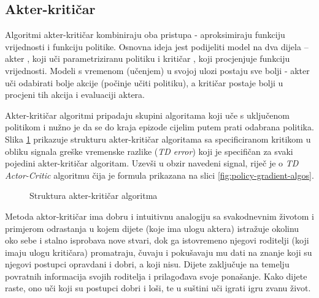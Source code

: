 \subsection{Akter-kritičar}

Algoritmi akter-kritičar  kombiniraju oba pristupa - aproksimiraju funkciju vrijednosti i funkciju politike. Osnovna ideja jest podijeliti model na dva dijela – akter , koji uči parametriziranu politiku i kritičar , koji procjenjuje funkciju vrijednosti. Modeli s vremenom (učenjem) u svojoj ulozi postaju sve bolji - akter uči odabirati bolje akcije (počinje učiti politiku), a kritičar postaje bolji u procjeni tih akcija i evaluaciji aktera.

Akter-kritičar algoritmi pripadaju skupini algoritama koji uče s uključenom politikom i nužno je da se do kraja epizode cijelim putem prati odabrana politika. Slika \ref{fig:actor-critic} prikazuje strukturu akter-kritičar algoritama sa specificiranom kritikom u obliku signala greške vremenske razlike (\textit{TD error}) koji je specifičan za svaki pojedini akter-kritičar algoritam. Uzevši u obzir navedeni signal, riječ je o \textit{TD Actor-Critic} algoritmu čija je formula prikazana na slici \ref{fig:policy-gradient-algos}.

\begin{figure}[H]
    \centering
    \caption{Struktura akter-kritičar algoritma \cite{http://www.incompleteideas.net/book/ebook/node66.html}}
    \label{fig:actor-critic}
\end{figure}

Metoda aktor-kritičar ima dobru i intuitivnu analogiju sa svakodnevnim životom i primjerom odrastanja u kojem dijete (koje ima ulogu aktera) istražuje okolinu oko sebe i stalno isprobava nove stvari, dok ga istovremeno njegovi roditelji (koji imaju ulogu kritičara) promatraju, čuvaju i pokušavaju mu dati na znanje koji su njegovi postupci opravdani i dobri, a koji nisu. Dijete zaključuje na temelju povratnih informacija svojih roditelja i prilagođava svoje ponašanje. Kako dijete raste, ono uči koji su postupci dobri i loši, te u suštini uči igrati igru zvanu život.

